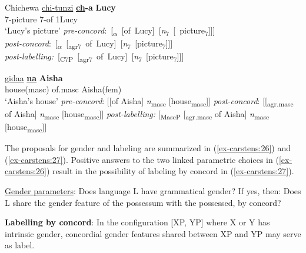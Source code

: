 \documentclass[output=paper
,modfonts
,nonflat]{langsci/langscibook}
\begin{document}
\begin{exe} \settowidth{}
	\ex \label{ex-carstens:24}
	\xlist
	\ex Chichewa\label{ex-carstens:24a} \newline
	\gll \underline{chi-tunzi}    \textbf{\underline{ch}-a}  \textbf{Lucy} \\
	7-picture    7-of     1Lucy\\
	\glt `Lucy’s picture'  	
	\ex\label{ex-carstens:24b} \mbox{\textit{pre-concord}:   [\textsubscript{$\alpha$} [of Lucy] [\textit{n}\textsubscript{7} [ picture\textsubscript{7}]]]}\\  
	\ex\label{ex-carstens:24c} \mbox{\textit{post-concord}:   [\textsubscript{$\alpha$} [\textsubscript{agr7} of Lucy] [\textit{n}\textsubscript{7} [picture\textsubscript{7}]]]}\\ 
	\ex\label{ex-carstens:24d} \mbox{\textit{post-labelling:} [\textsubscript{C7P} [\textsubscript{agr7} of Lucy] [\textit{n}\textsubscript{7} [picture\textsubscript{7}]]]}\\ 
	\endxlist
\end{exe}
\begin{exe} 
	\ex \label{ex-carstens:25}
	\xlist
	\ex 
	\gll \underline{gidaa}    \textbf{\underline{na}}  \textbf{Aisha} \\
	house(masc)   of.masc   Aisha(fem)\\
	\glt `Aisha's house'  	
	\ex \textit{pre-concord}:   [[of Aisha] \textit{n}\textsubscript{masc} [house\textsubscript{masc}]]
	\ex \textit{post-concord}:   [[\textsubscript{agr.masc} of Aisha] \textit{n}\textsubscript{masc} [house\textsubscript{masc}]]
	\ex \textit{post-labelling:} [\textsubscript{MascP} [\textsubscript{agr.masc} of Aisha] \textit{n}\textsubscript{masc} [house\textsubscript{masc}]]
	\endxlist
\end{exe}
The proposals for gender and labeling are summarized in (\ref{ex-carstens:26}) and (\ref{ex-carstens:27}). Positive answers to the two linked parametric choices in (\ref{ex-carstens:26}) result in the possibility of labeling by concord in (\ref{ex-carstens:27}). 

\begin{exe}
\ex \label{ex-carstens:26} \underline{Gender parameters}:
\xlist
\ex Does language L have grammatical gender? If yes, then:                   
\ex Does L share the gender feature of the possessum with the possessed, by concord?
\endxlist
\end{exe}
\begin{exe}
\ex \label{ex-carstens:27}
\textbf{Labelling by concord}: In the configuration [XP, YP] where X or Y has intrinsic gender, concordial gender features shared between XP and YP may serve as label.
\end{exe}
\end{document}
